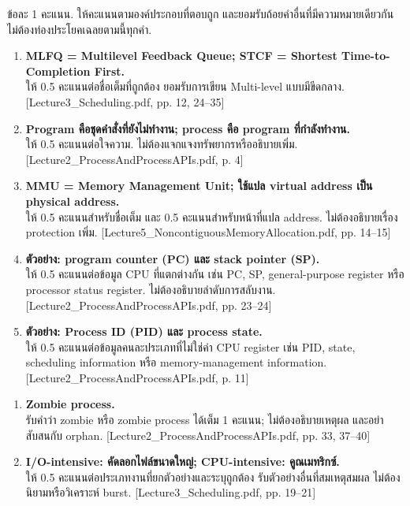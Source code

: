 \newpage{}
\noindent ข้อละ 1 คะแนน. ให้คะแนนตามองค์ประกอบที่ตอบถูก และยอมรับถ้อยคำอื่นที่มีความหมายเดียวกัน ไม่ต้องท่องประโยคเฉลยตามนี้ทุกคำ.\par\smallskip
\begin{enumerate}[leftmargin=1.4em,itemsep=.25cm]
\item \textbf{MLFQ = Multilevel Feedback Queue; STCF = Shortest Time-to-Completion First.}\\ให้ 0.5 คะแนนต่อชื่อเต็มที่ถูกต้อง ยอมรับการเขียน Multi-level แบบมีขีดกลาง. {\small [Lecture3\_Scheduling.pdf, pp. 12, 24--35]}
\item \textbf{Program คือชุดคำสั่งที่ยังไม่ทำงาน; process คือ program ที่กำลังทำงาน.}\\ให้ 0.5 คะแนนต่อใจความ. ไม่ต้องแจกแจงทรัพยากรหรืออธิบายเพิ่ม. {\small [Lecture2\_ProcessAndProcessAPIs.pdf, p. 4]}
\item \textbf{MMU = Memory Management Unit; ใช้แปล virtual address เป็น physical address.}\\ให้ 0.5 คะแนนสำหรับชื่อเต็ม และ 0.5 คะแนนสำหรับหน้าที่แปล address. ไม่ต้องอธิบายเรื่อง protection เพิ่ม. {\small [Lecture5\_NoncontiguousMemoryAllocation.pdf, pp. 14--15]}
\item \textbf{ตัวอย่าง: program counter (PC) และ stack pointer (SP).}\\ให้ 0.5 คะแนนต่อข้อมูล CPU ที่แตกต่างกัน เช่น PC, SP, general-purpose register หรือ processor status register. ไม่ต้องอธิบายลำดับการสลับงาน. {\small [Lecture2\_ProcessAndProcessAPIs.pdf, pp. 23--24]}
\item \textbf{ตัวอย่าง: Process ID (PID) และ process state.}\\ให้ 0.5 คะแนนต่อข้อมูลคนละประเภทที่ไม่ใช่ค่า CPU register เช่น PID, state, scheduling information หรือ memory-management information. {\small [Lecture2\_ProcessAndProcessAPIs.pdf, p. 11]}
\end{enumerate}\newpage{}\begin{enumerate}[leftmargin=1.4em,start=6,itemsep=.25cm]
\item \textbf{Zombie process.}\\รับคำว่า zombie หรือ zombie process ได้เต็ม 1 คะแนน; ไม่ต้องอธิบายเหตุผล และอย่าสับสนกับ orphan. {\small [Lecture2\_ProcessAndProcessAPIs.pdf, pp. 33, 37--40]}
\item \textbf{I/O-intensive: คัดลอกไฟล์ขนาดใหญ่; CPU-intensive: คูณเมทริกซ์.}\\ให้ 0.5 คะแนนต่อประเภทงานที่ยกตัวอย่างและระบุถูกต้อง รับตัวอย่างอื่นที่สมเหตุสมผล ไม่ต้องนิยามหรือวิเคราะห์ burst. {\small [Lecture3\_Scheduling.pdf, pp. 19--21]}

\end{enumerate}
